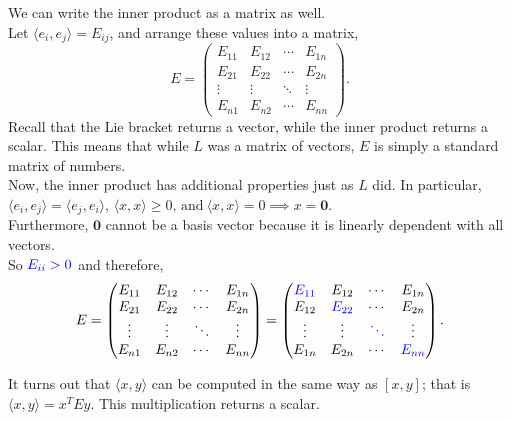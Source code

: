 \documentclass[11 pt]{article}
\newcommand{\br}[2]{\left[#1,#2\right]}
\newcommand{\inp}[2]{\langle #1, #2 \rangle}
\newcommand{\zvec}{\mathbf{0}}
\newcommand{\blu}[1]{{\color{blue} #1}}
\begin{document}
    We can write the inner product as a matrix as well.
    \\Let $\inp{e_i}{e_j} = E_{ij}$, and arrange these values into a matrix,
    $$
        E = \begin{pmatrix}
                E_{11} & E_{12} & \cdots & E_{1n} \\
                E_{21} & E_{22} & \cdots & E_{2n} \\
                \vdots & \vdots & \ddots & \vdots \\
                E_{n1} & E_{n2} & \cdots & E_{nn}
            \end{pmatrix}.
    $$
    Recall that the Lie bracket returns a vector, while the inner product
    returns a scalar. This means that while $L$ was a matrix of vectors,
    $E$ is simply a standard matrix of numbers.
    \\Now, the inner product has additional properties just as $L$ did. In particular,
    \\$\inp{e_i}{e_j} = \inp{e_j}{e_i}$,
    $\inp{x}{x} \ge 0 \text{, and} \ \inp{x}{x}=0 \implies x=\zvec$.
    \\Furthermore, $\zvec$ cannot be a basis vector because it is linearly dependent with all vectors.
    \\So $\blu{E_{ii}>0}$ and therefore,
    $$
        E = \begin{pmatrix}
                E_{11} & E_{12} & \cdots & E_{1n} \\
                E_{21} & E_{22} & \cdots & E_{2n} \\
                \vdots & \vdots & \ddots & \vdots \\
                E_{n1} & E_{n2} & \cdots & E_{nn}
            \end{pmatrix}
          = \begin{pmatrix}
            \blu{E_{11}} & E_{12} & \cdots & E_{1n} \\
            E_{12} & \blu{E_{22}} & \cdots & E_{2n} \\
            \vdots & \vdots & \blu{\ddots} & \vdots \\
            E_{1n} & E_{2n} & \cdots & \blu{E_{nn}}
            \end{pmatrix}.
    $$

    It turns out that $\inp{x}{y}$ can be computed in the same way as
    $\br{x}{y}$; that is $\inp{x}{y} = x^{T}Ey$. This multiplication returns a
    scalar.
\end{document}
